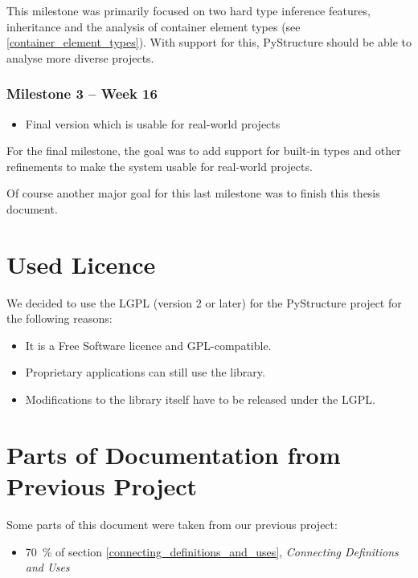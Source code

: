 \documentclass[12pt,halfparskip,DIV11,BCOR10mm]{scrreprt}
\begin{document}
This milestone was primarily focused on two hard type inference features, inheritance and the analysis of container element types (see \vref{container_element_types}). With support for this, PyStructure should be able to analyse more diverse projects.

\subsubsection{Milestone 3 – Week 16}

\begin{itemize}
    \item Final version which is usable for real-world projects
\end{itemize}

For the final milestone, the goal was to add support for built-in types and other refinements to make the system usable for real-world projects.

Of course another major goal for this last milestone was to finish this thesis document.


\section{Used Licence}

We decided to use the LGPL (version 2 or later) for the PyStructure project for the following reasons:

\begin{itemize}
    \item It is a Free Software licence and GPL-compatible.
    \item Proprietary applications can still use the library.
    \item Modifications to the library itself have to be released under the LGPL.
\end{itemize}

\section{Parts of Documentation from Previous Project}

Some parts of this document were taken from our previous project:

\begin{itemize}
    \item 70~\% of section \vref{connecting_definitions_and_uses}, \emph{Connecting Definitions and Uses}
\end{itemize}
\end{document}
